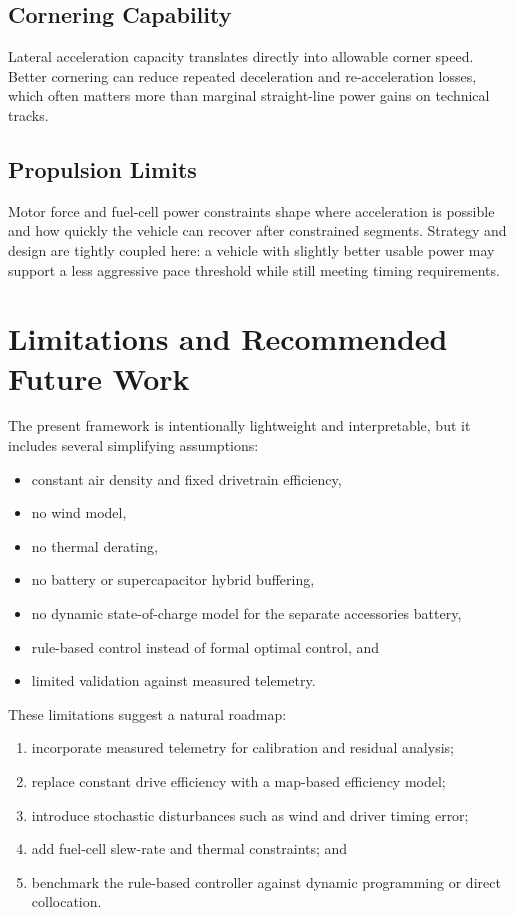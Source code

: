 \documentclass[11pt]{article}
\begin{document}
\subsection{Cornering Capability}

Lateral acceleration capacity translates directly into allowable corner speed. Better cornering can reduce repeated deceleration and re-acceleration losses, which often matters more than marginal straight-line power gains on technical tracks.

\subsection{Propulsion Limits}

Motor force and fuel-cell power constraints shape where acceleration is possible and how quickly the vehicle can recover after constrained segments. Strategy and design are tightly coupled here: a vehicle with slightly better usable power may support a less aggressive pace threshold while still meeting timing requirements.

\section{Limitations and Recommended Future Work}

The present framework is intentionally lightweight and interpretable, but it includes several simplifying assumptions:

\begin{itemize}[leftmargin=1.5em]
\item constant air density and fixed drivetrain efficiency,
\item no wind model,
\item no thermal derating,
\item no battery or supercapacitor hybrid buffering,
\item no dynamic state-of-charge model for the separate accessories battery,
\item rule-based control instead of formal optimal control, and
\item limited validation against measured telemetry.
\end{itemize}

These limitations suggest a natural roadmap:

\begin{enumerate}[leftmargin=1.5em]
\item incorporate measured telemetry for calibration and residual analysis;
\item replace constant drive efficiency with a map-based efficiency model;
\item introduce stochastic disturbances such as wind and driver timing error;
\item add fuel-cell slew-rate and thermal constraints; and
\item benchmark the rule-based controller against dynamic programming or direct collocation.
\end{enumerate}
\end{document}
